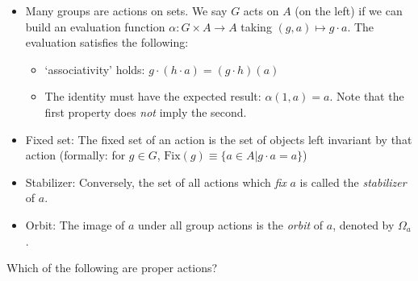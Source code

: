 \documentclass[1    0pt, answers]{exam} \renewcommand{\baselinestretch}{1.05}
\theoremstyle{plain}
\theoremstyle{definition}
\begin{document}
\begin{questions}
\begin{itemize}
\item Many groups are actions on sets. We say $G$ acts on $A$ (on the left) if we can build an evaluation function $\alpha: G \times A \to A$ taking $(g, a) \mapsto g \cdot a$. The evaluation satisfies the following:
\begin{itemize}
    \item `associativity' holds: $g \cdot (h \cdot a) = (g \cdot h)(a)$
    \item The identity must have the expected result: $\alpha(1, a) = a$. Note that the first property does \emph{not} imply the second.
\end{itemize}
\item Fixed set: The fixed set of an action is the set of objects left invariant by that action (formally: for $g \in G$, $\text{Fix}(g) \equiv \{ a \in A | g \cdot a = a \}$)
\item Stabilizer: Conversely, the set of all actions which \emph{fix} $a$ is called the \emph{stabilizer} of $a$.
\item Orbit: The image of $a$ under all group actions is the \emph{orbit} of $a$, denoted by $\Omega_a$.
\end{itemize}

\question Which of the following are proper actions?


\end{questions}
\end{document}
